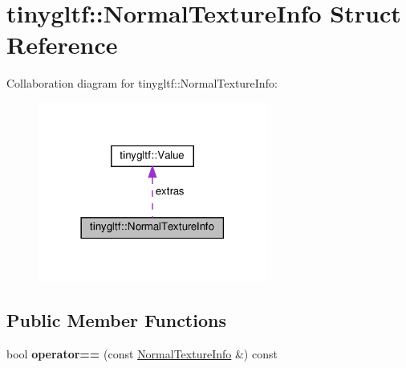 \hypertarget{structtinygltf_1_1NormalTextureInfo}{}\section{tinygltf\+:\+:Normal\+Texture\+Info Struct Reference}
\label{structtinygltf_1_1NormalTextureInfo}


Collaboration diagram for tinygltf\+:\+:Normal\+Texture\+Info\+:\nopagebreak
\begin{figure}[H]
\begin{center}
\leavevmode
\includegraphics[width=213pt]{structtinygltf_1_1NormalTextureInfo__coll__graph}
\end{center}
\end{figure}
\subsection*{Public Member Functions}
\begin{DoxyCompactItemize}
\item 
\mbox{\label{structtinygltf_1_1NormalTextureInfo_a28e67e2b3008c047936d578b6a1db6d5}} 
bool {\bfseries operator==} (const \hyperlink{structtinygltf_1_1NormalTextureInfo}{Normal\+Texture\+Info} \&) const
\end{DoxyCompactItemize}
